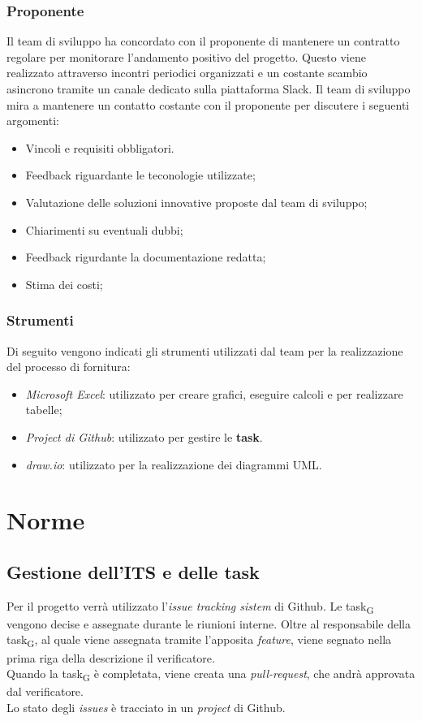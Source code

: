 \documentclass{article}
\begin{document}
\subsubsection{Proponente}
Il team di sviluppo ha concordato con il proponente di mantenere un contratto regolare per monitorare l'andamento positivo del progetto. Questo viene realizzato attraverso incontri periodici organizzati e un costante scambio asincrono tramite un canale dedicato sulla piattaforma Slack. Il team di sviluppo mira a mantenere un contatto costante con il proponente per discutere i seguenti argomenti:
\begin{itemize}
    \item Vincoli e requisiti obbligatori.
    \item Feedback riguardante le teconologie utilizzate;
    \item Valutazione delle soluzioni innovative proposte dal team di sviluppo;
    \item Chiarimenti su eventuali dubbi;
    \item Feedback rigurdante la documentazione redatta;
    \item Stima dei costi;
\end{itemize}

\subsubsection*{Strumenti}
Di seguito vengono indicati gli strumenti utilizzati dal team per la realizzazione del processo di fornitura:\begin{itemize}
    \item \textit{Microsoft Excel}: utilizzato per creare grafici, eseguire calcoli e per realizzare tabelle;
    \item \textit{Project di Github}: utilizzato per gestire le \textbf{task}.
    \item \textit{draw.io}: utilizzato per la realizzazione dei diagrammi UML.
\end{itemize}



\section{Norme}
\subsection{Gestione dell'ITS e delle task}
Per il progetto verrà utilizzato l'\textit{issue tracking sistem} di Github. Le task\textsubscript{G} vengono decise e assegnate durante le riunioni interne. Oltre al responsabile della task\textsubscript{G}, al quale viene assegnata tramite l'apposita \textit{feature}, viene segnato nella prima riga della descrizione il verificatore.\\
Quando la task\textsubscript{G} è completata, viene creata una \textit{pull-request}, che andrà approvata dal verificatore.\\
Lo stato degli \textit{issues} è tracciato in un \textit{project} di Github.
\end{document}
